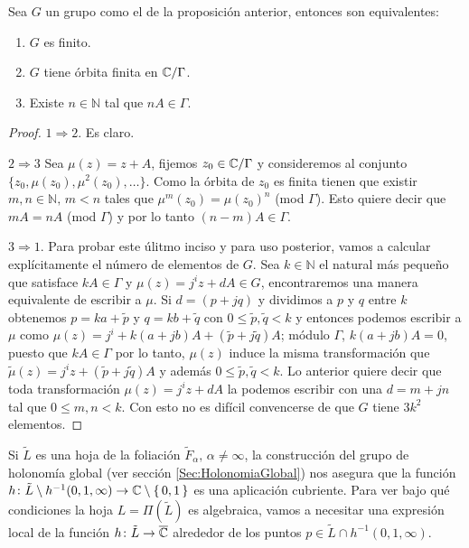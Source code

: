 \begin{Corolario}
\label{Coro:Equivalencias}
Sea $G$ un grupo como el de la proposición anterior, entonces son equivalentes:
\begin{enumerate}
\item $G$ es finito.
\item $G$ tiene órbita finita en $\mathbb{C}/\Gamma$.
\item Existe $n\in\mathbb{N}$ tal que $nA\in\Gamma$.
\end{enumerate}
\end{Corolario}
\begin{proof}
$1\Rightarrow 2$. Es claro.

\noindent $2\Rightarrow 3$ Sea $\mu(z)=z+A$, fijemos $z_{0}\in\mathbb{C}/\Gamma$ y consideremos al conjunto $\{z_{0},\mu(z_{0}),\mu^{2}(z_{0}),\ldots \}$. Como la órbita de $z_{0}$ es finita tienen que existir $m,n\in\mathbb{N},\, m<n$ tales que $\mu^{m}(z_{0})=\mu(z_{0})^{n}$ (mod $\Gamma$). Esto quiere decir que $mA=nA$ (mod $\Gamma$) y por lo tanto $(n-m)A\in\Gamma$.

\noindent $3\Rightarrow 1$. Para probar este úlitmo inciso y para uso posterior, vamos a calcular explícitamente el número de elementos de $G$. Sea $k\in\mathbb{N}$ el natural más pequeño que satisface $kA\in\Gamma$ y $\mu(z)=j^{i}z+dA\in G$, encontraremos una manera equivalente de escribir a $\mu$. Si $d=(p+jq)$ y dividimos a $p$ y $q$ entre $k$ obtenemos $p=ka +\tilde{p}$ y $q=kb+\tilde{q}$ con $0\leq\tilde{p},\tilde{q}<k$ y entonces podemos escribir a $\mu$ como $\mu(z)=j^{i}+k(a+jb)A+(\tilde{p}+j\tilde{q})A$; módulo $\Gamma$, $k(a+jb)A=0$, puesto que $kA\in\Gamma$ por lo tanto, $\mu(z)$ induce la misma transformación que $\tilde{\mu}(z)=j^{i}z+(\tilde{p}+j\tilde{q})A$ y además $0\leq\tilde{p},\tilde{q}<k$. Lo anterior quiere decir que toda transformación $\mu(z)=j^{i}z+dA$ la podemos escribir con una $d=m+jn$ tal que $0\leq m,n<k$. Con esto no es difícil convencerse de que $G$ tiene $3k^{2}$ elementos.
\end{proof}

Si $\tilde{L}$ es una hoja de la foliación $\tilde{F}_{\alpha},\, \alpha\neq\infty$, la construcción del grupo de holonomía global (ver sección \ref{Sec:HolonomiaGlobal}) nos asegura que la función $h\colon \tilde{L}\setminus h^{-1}(0,1,\infty)\rightarrow\mathbb{C}\setminus\{\, 0,1 \, \}$ es una aplicación cubriente. Para ver bajo qué condiciones la hoja $L=\Pi(\tilde{L})$ es algebraica, vamos a necesitar una expresión local de la función $h\colon \tilde{L}\rightarrow\overline{\mathbb{C}}$ alrededor de los puntos $p\in\tilde{L}\cap h^{-1}(0,1,\infty)$.

